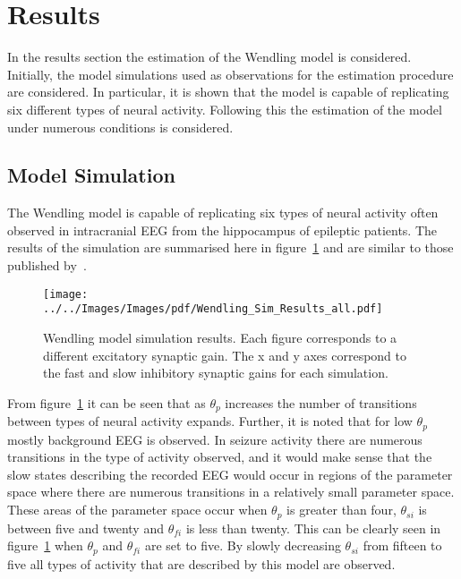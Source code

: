 \section{Results}

In the results section the estimation of the Wendling model is considered. Initially, the model simulations used as observations for the estimation procedure are considered. In particular, it is shown that the model is capable of replicating six different types of neural activity. Following this the estimation of the model under numerous conditions is considered. 

\subsection{Model Simulation}

The Wendling model is capable of replicating six types of neural activity often observed in intracranial EEG from the hippocampus of epileptic patients. The results of the simulation are summarised here in figure~\ref{fig: SimResults} and are similar to those published by~\cite{wendling2002epileptic}. 
\begin{figure}%
	\centering
		\texttt{[image: ../../Images/Images/pdf/Wendling\_Sim\_Results\_all.pdf]}
	\caption{Wendling model simulation results. Each figure corresponds to a different excitatory synaptic gain. The x and y axes correspond to the fast and slow inhibitory synaptic gains for each simulation.}
	\label{fig: SimResults}
\end{figure}%


From figure~\ref{fig: SimResults} it can be seen that as $\theta_{p}$ increases the number of transitions between types of neural activity expands. Further, it is noted that for low $\theta_{p}$ mostly background EEG is observed. In seizure activity there are numerous transitions in the type of activity observed, and it would make sense that the slow states describing the recorded EEG would occur in regions of the parameter space where there are numerous transitions in a relatively small parameter space. These areas of the parameter space occur when $\theta_{p}$ is greater than four, $\theta_{si}$ is between five and twenty and $\theta_{fi}$ is less than twenty. This can be clearly seen in figure~\ref{fig: SimResults} when $\theta_{p}$ and $\theta_{fi}$ are set to five. By slowly decreasing $\theta_{si}$ from fifteen to five all types of activity that are described by this model are observed.

